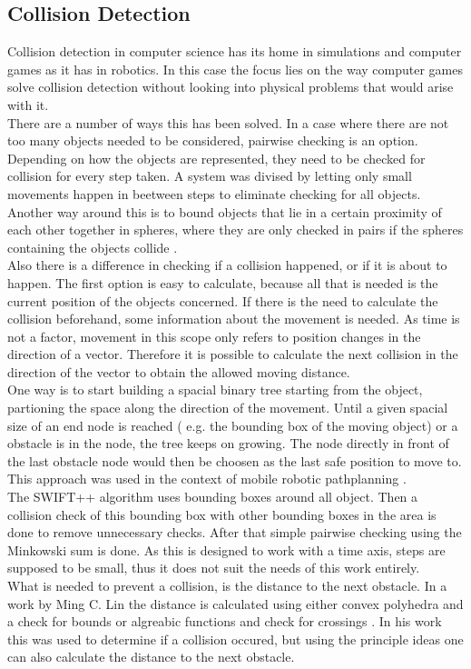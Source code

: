 \subsection{Collision Detection}
Collision detection in computer science has its home in simulations and computer games as it has in robotics. In this case the focus lies on the way computer games solve collision detection without looking into physical problems that would arise with it.\\
There are a number of ways this has been solved. In a case where there are not too many objects needed to be considered, pairwise checking is an option. Depending on how the objects are represented, they need to be checked for collision for every step taken. A system was divised by letting only small movements happen in beetween steps \cite{pairwise} to eliminate checking for all objects. Another way around this is to bound objects that lie in a certain proximity of each other together in spheres, where they are only checked in pairs if the spheres containing the objects collide \cite{sphere}.\\
Also there is a difference in checking if a collision happened, or if it is about to happen. The first option is easy to calculate, because all that is needed is the current position of the objects concerned. If there is the need to calculate the collision beforehand, some information about the movement is needed. As time is not a factor, movement in this scope only refers to position changes in the direction of a vector. Therefore it is possible to calculate the next collision in the direction of the vector to obtain the allowed moving distance.\\
One way is to start building a spacial binary tree starting from the object, partioning the space along the direction of the movement. Until a given spacial size of an end node is reached ( e.g. the bounding box of the moving object) or a obstacle is in the node, the tree keeps on growing. The node directly in front of the last obstacle node would then be choosen as the last safe position to move to. This approach was used in the context of mobile robotic pathplanning \cite{binTree}.\\
The SWIFT++ algorithm \cite{swift} uses bounding boxes around all object. Then a collision check of this bounding box with other bounding boxes in the area  is done to remove unnecessary checks. After that simple pairwise checking using the Minkowski sum is done. As this is designed to work with a time axis, steps are supposed to be small, thus it does not suit the needs of this work entirely.\\
What is needed to prevent a collision, is the distance to the next obstacle. In a work by Ming C. Lin the distance is calculated using either convex polyhedra and a check for bounds or algreabic functions and check for crossings \cite{collision}. In his work this was used to determine if a collision occured, but using the principle ideas one can also calculate the distance to the next obstacle.\\


